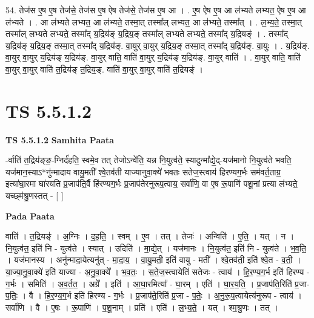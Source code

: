 \documentclass[17pt]{extarticle}
\begin{document}
54. तेज॑स ए॒ष ए॒ष तेज॑से॒ तेज॑स ए॒ष ऐष तेज॑से॒ तेज॑स ए॒ष आ । . ए॒ष ऐष ए॒ष आ ल॑भ्यते लभ्यत॒ ऐष ए॒ष आ ल॑भ्यते । . आ ल॑भ्यते लभ्यत॒ आ ल॑भ्यते॒ तस्मा॒त् तस्मा᳚ल् लभ्यत॒ आ ल॑भ्यते॒ तस्मा᳚त् । . ल॒भ्य॒ते॒ तस्मा॒त् तस्मा᳚ल् लभ्यते लभ्यते॒ तस्मा᳚द् य॒द्रिय॑ङ् य॒द्रिय॒ङ् तस्मा᳚ल् लभ्यते लभ्यते॒ तस्मा᳚द् य॒द्रियङ्॑ । . तस्मा᳚द् य॒द्रिय॑ङ् य॒द्रिय॒ङ् तस्मा॒त् तस्मा᳚द् य॒द्रिय॑ङ्. वा॒युर् वा॒युर् य॒द्रिय॒ङ् तस्मा॒त् तस्मा᳚द् य॒द्रिय॑ङ्. वा॒युः । . य॒द्रिय॑ङ्. वा॒युर् वा॒युर् य॒द्रिय॑ङ् य॒द्रिय॑ङ्. वा॒युर् वाति॒ वाति॑ वा॒युर् य॒द्रिय॑ङ् य॒द्रिय॑ङ्. वा॒युर् वाति॑ । . वा॒युर् वाति॒ वाति॑ वा॒युर् वा॒युर् वाति॑ त॒द्रिय॑ङ् त॒द्रिय॒ङ्. वाति॑ वा॒युर् वा॒युर् वाति॑ त॒द्रियङ्॑ । \newline
\pagebreak
{}

\section{ TS 5.5.1.2 }

\textbf{TS 5.5.1.2 } \newline
\textbf{Samhita Paata} \newline

-र्वाति॑ त॒द्रिय॑ङ्ङ॒-ग्निर्द॑हति॒ स्वमे॒व तत् तेजोऽन्वे॑ति॒ यन्न नि॒युत्व॑ते॒ स्यादुन्मा᳚द्ये॒द्-यज॑मानो नि॒युत्व॑ते भवति॒ यज॑मान॒स्याऽ*नु॑न्मादाय वायु॒मती᳚ श्वे॒तव॑ती याज्यानुवा॒क्ये॑ भवतः सतेज॒स्त्वाय॑ हिरण्यग॒र्भः सम॑वर्त॒ताग्र॒ इत्या॑घा॒रमा घा॑रयति प्र॒जाप॑ति॒र्वै हि॑रण्यग॒र्भः प्र॒जाप॑तेरनुरूप॒त्वाय॒ सर्वा॑णि॒ वा ए॒ष रू॒पाणि॑ पशू॒नां प्रत्या ल॑भ्यते॒ यच्छ्म॑श्रु॒णस्तत् - [  ] \newline

\textbf{Pada Paata} \newline

वाति॑ । त॒द्रियङ्॑ । अ॒ग्निः । द॒ह॒ति॒ । स्वम् । ए॒व । तत् । तेजः॑ । अन्विति॑ । ए॒ति॒ । यत् । न । नि॒युत्व॑त॒ इति॑ नि - युत्व॑ते । स्यात् । उदिति॑ । मा॒द्ये॒त् । यज॑मानः । नि॒युत्व॑त॒ इति॑ नि - युत्व॑ते । भ॒व॒ति॒ । यज॑मानस्य । अनु॑न्मादा॒येत्यनु॑त् - मा॒दा॒य॒ । वा॒यु॒मती॒ इति॑ वायु - मती᳚ । श्वे॒तव॑ती॒ इति॑ श्वे॒त - व॒ती॒ । या॒ज्या॒नु॒वा॒क्ये॑ इति॑ याज्या - अ॒नु॒वा॒क्ये᳚ । भ॒व॒तः॒ । स॒ते॒ज॒स्त्वायेति॑ सतेजः - त्वाय॑ । हि॒र॒ण्य॒ग॒र्भ इति॑ हिरण्य - ग॒र्भः । समिति॑ । अ॒व॒र्त॒त॒ । अग्रे᳚ । इति॑ । आ॒घा॒रमित्या᳚ - घा॒रम् । एति॑ । घा॒र॒य॒ति॒ । प्र॒जाप॑ति॒रिति॑ प्र॒जा-प॒तिः॒ । वै । हि॒र॒ण्य॒ग॒र्भ इति॑ हिरण्य - ग॒र्भः । प्र॒जाप॑ते॒रिति॑ प्र॒जा - प॒तेः॒ । अ॒नु॒रू॒प॒त्वायेत्य॑नुरूप - त्वाय॑ । सर्वा॑णि । वै । ए॒षः । रू॒पाणि॑ । प॒शू॒नाम् । प्रति॑ । एति॑ । ल॒भ्य॒ते॒ । यत् । श्म॒श्रु॒णः । तत् ।  \newline
\end{document}
